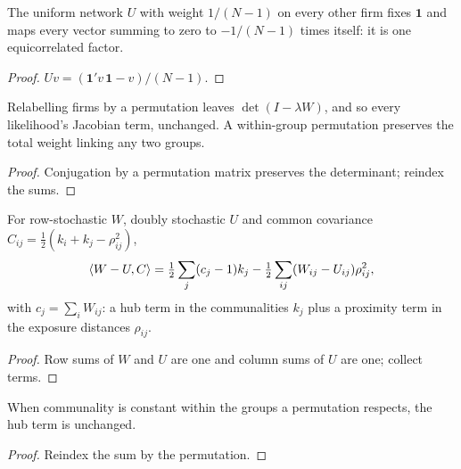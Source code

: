 \begin{lemma}\label{thm:network-uniform}
  \leanok
  The uniform network $U$ with weight $1/(N-1)$ on every other firm fixes
  $\mathbf1$ and maps every vector summing to zero to $-1/(N-1)$ times itself:
  it is one equicorrelated factor.
\end{lemma}
\begin{proof}\leanok
  $Uv=(\mathbf1'v\,\mathbf1-v)/(N-1)$.
\end{proof}

\begin{lemma}\label{thm:network-placebo}
  \leanok
  Relabelling firms by a permutation leaves $\det(I-\lambda W)$, and so every
  likelihood's Jacobian term, unchanged. A within-group permutation preserves
  the total weight linking any two groups.
\end{lemma}
\begin{proof}\leanok
  Conjugation by a permutation matrix preserves the determinant; reindex the
  sums.
\end{proof}

\begin{theorem}\label{thm:value-decomposition}
  \leanok
  For row-stochastic $W$, doubly stochastic $U$ and common covariance
  $C_{ij}=\tfrac12(k_i+k_j-\rho_{ij}^2)$,
  \[
    \left\langle W-U,C\right\rangle=\tfrac12\sum_j(c_j-1)k_j-\tfrac12\sum_{ij}(W_{ij}-U_{ij})\rho_{ij}^2,
  \]
  with $c_j=\sum_iW_{ij}$: a hub term in the communalities $k_j$ plus a
  proximity term in the exposure distances $\rho_{ij}$.
\end{theorem}
\begin{proof}\leanok
  Row sums of $W$ and $U$ are one and column sums of $U$ are one; collect terms.
\end{proof}

\begin{lemma}\label{thm:value-placebo}
  \leanok
  When communality is constant within the groups a permutation respects, the
  hub term is unchanged.
\end{lemma}
\begin{proof}\leanok
  Reindex the sum by the permutation.
\end{proof}

